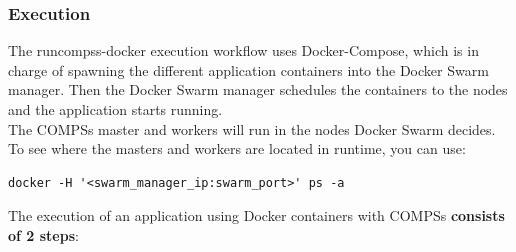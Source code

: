 \subsubsection{Execution}

The runcompss-docker execution workflow uses Docker-Compose, which is in charge of spawning the different application containers into the Docker Swarm manager.
Then the Docker Swarm manager schedules the containers to the nodes and the application starts running.\\

The COMPSs master and workers will run in the nodes Docker Swarm decides. To see where the masters and workers are located in runtime,
you can use:
\begin{lstlisting} 
docker -H '<swarm_manager_ip:swarm_port>' ps -a 
\end{lstlisting}

The execution of an application using Docker containers with COMPSs \textbf{consists of 2 steps}:

